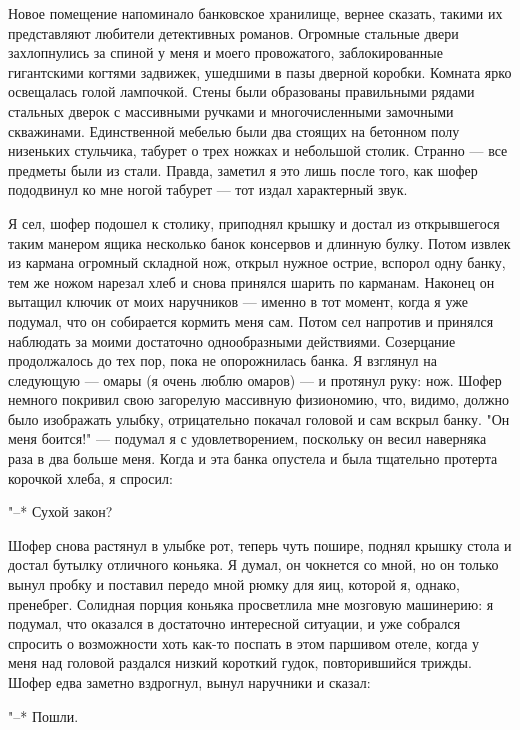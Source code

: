 Новое помещение напоминало банковское хранилище, вернее сказать, такими
их представляют любители  детективных  романов.  Огромные  стальные  двери
захлопнулись  за  спиной  у  меня  и  моего  провожатого,  заблокированные
гигантскими когтями задвижек, ушедшими в  пазы  дверной  коробки.  Комната
ярко освещалась голой лампочкой. Стены были образованы правильными  рядами
стальных  дверок  с  массивными  ручками   и   многочисленными   замочными
скважинами.  Единственной  мебелью  были  два  стоящих  на  бетонном  полу
низеньких стульчика, табурет о трех ножках и небольшой столик.  Странно  ---
все предметы были из стали. Правда, заметил я это  лишь  после  того,  как
шофер пододвинул ко мне ногой табурет --- тот издал характерный звук.

Я  сел,  шофер  подошел  к  столику,  приподнял  крышку  и  достал   из
открывшегося таким манером  ящика  несколько  банок  консервов  и  длинную
булку. Потом извлек  из  кармана  огромный  складной  нож,  открыл  нужное
острие, вспорол одну банку, тем же ножом нарезал  хлеб  и  снова  принялся
шарить по карманам. Наконец он вытащил ключик от моих наручников ---  именно
в тот момент, когда я уже подумал, что он  собирается  кормить  меня  сам.
Потом сел напротив и принялся наблюдать за моими достаточно  однообразными
действиями. Созерцание продолжалось  до  тех  пор,  пока  не  опорожнилась
банка. Я взглянул на следующую --- омары (я очень люблю омаров) --- и протянул
руку: нож. Шофер немного покривил  свою  загорелую  массивную  физиономию,
что, видимо, должно было изображать улыбку, отрицательно покачал головой и
сам вскрыл банку.  "Он  меня  боится!"  ---  подумал  я  с  удовлетворением,
поскольку он весил наверняка раза в два больше меня.  Когда  и  эта  банка
опустела и была тщательно протерта корочкой хлеба, я спросил:

"--* Сухой закон?

Шофер снова растянул в улыбке рот, теперь чуть  пошире,  поднял  крышку
стола и достал бутылку отличного коньяка. Я думал, он чокнется со мной, но
он только вынул пробку и поставил передо мной рюмку для  яиц,  которой  я,
однако,  пренебрег.  Солидная  порция  коньяка  просветлила  мне  мозговую
машинерию: я подумал, что оказался в достаточно интересной ситуации, и уже
собрался спросить о возможности хоть как-то поспать в этом паршивом отеле,
когда у меня над головой раздался  низкий  короткий  гудок,  повторившийся
трижды. Шофер едва заметно вздрогнул, вынул наручники и сказал:

"--* Пошли.

